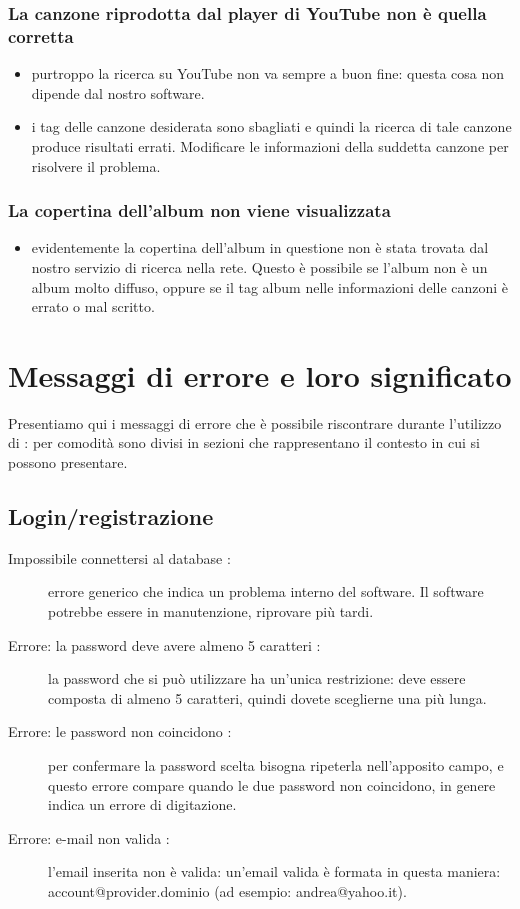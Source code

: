 \subsection*{La canzone riprodotta dal player di YouTube non \`e quella
corretta}
\begin{itemize}
  \item purtroppo la ricerca su YouTube non va sempre a buon fine: questa cosa
  non dipende dal nostro software.
  \item i tag delle canzone desiderata sono sbagliati e quindi la
  ricerca di tale canzone produce risultati errati. Modificare le informazioni
  della suddetta canzone per risolvere il problema.
\end{itemize}

\subsection*{La copertina dell'album non viene visualizzata}
\begin{itemize}
  \item evidentemente la copertina dell'album in questione non \`e stata
  trovata dal nostro servizio di ricerca nella rete. Questo \`e possibile se
  l'album non \`e un album molto diffuso, oppure se il tag album nelle
  informazioni delle canzoni \`e errato o mal scritto.
\end{itemize}

\appendix %
\chapter{Messaggi di errore e loro significato}
\thispagestyle{fancy}
Presentiamo qui i messaggi di errore che \`e possibile riscontrare durante
l'utilizzo di : per comodit\`a sono divisi in sezioni che
rappresentano il contesto in cui si possono presentare.
\section{Login/registrazione}
\begin{description}
	\item[Impossibile connettersi al database :] errore generico che
	indica un problema interno del software. Il software potrebbe essere in manutenzione,
	riprovare pi\`u tardi.
	\item[Errore: la password deve avere almeno 5 caratteri :] la password
	che si pu\`o utilizzare ha un'unica restrizione: deve essere composta di almeno 5
	caratteri, quindi dovete sceglierne una pi\`u lunga.
	\item [Errore: le password non coincidono :] per confermare la
	password scelta bisogna ripeterla nell'apposito campo, e questo errore compare
	quando le due password non coincidono, in genere indica un errore di
	digitazione.
	\item[Errore: e-mail non valida :] l'email inserita non \`e valida:
	un'email valida \`e formata in questa maniera: account@provider.dominio (ad
	esempio: andrea@yahoo.it).
\end{description}

